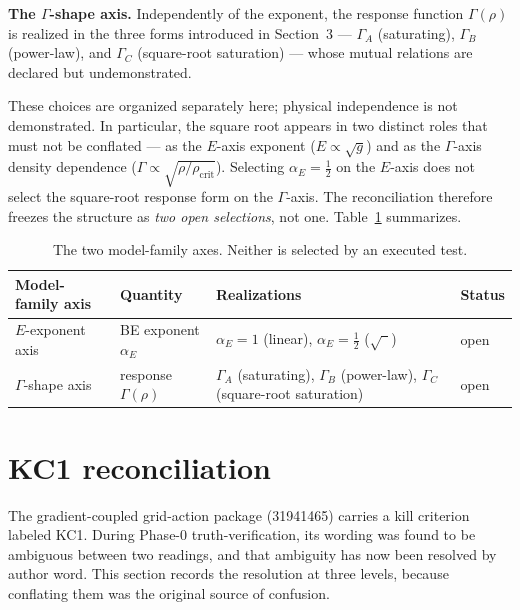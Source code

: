 \documentclass[11pt,a4paper]{article}
\begin{document}
\textbf{The $\Gamma$-shape axis.} Independently of the exponent, the response function $\Gamma(\rho)$ is realized in the three forms introduced in Section~3 --- $\Gamma_{A}$ (saturating), $\Gamma_{B}$ (power-law), and $\Gamma_{C}$ (square-root saturation) --- whose mutual relations are declared but undemonstrated.

These choices are organized separately here; physical independence is not demonstrated. In particular, the square root appears in two distinct roles that must not be conflated --- as the $E$-axis exponent ($E \propto \sqrt{g}$) and as the $\Gamma$-axis density dependence ($\Gamma \propto \sqrt{\rho/\rho_{\mathrm{crit}}}$). Selecting $\alpha_{E} = \tfrac{1}{2}$ on the $E$-axis does not select the square-root response form on the $\Gamma$-axis. The reconciliation therefore freezes the structure as \emph{two open selections}, not one. Table~\ref{tab:axes} summarizes.

\begin{table}[h]
\centering
\small
\begin{tabular}{llll}
\toprule
Model-family axis & Quantity & Realizations & Status \\
\midrule
$E$-exponent axis & BE exponent $\alpha_{E}$ & $\alpha_{E}=1$ (linear), $\alpha_{E}=\tfrac{1}{2}$ ($\sqrt{\phantom{g}}$) & open \\
$\Gamma$-shape axis & response $\Gamma(\rho)$ & $\Gamma_{A}$ (saturating), $\Gamma_{B}$ (power-law), $\Gamma_{C}$ (square-root saturation) & open \\
\bottomrule
\end{tabular}
\caption{The two model-family axes. Neither is selected by an executed test.}
\label{tab:axes}
\end{table}

\section{KC1 reconciliation}
\label{sec:kc1}

The gradient-coupled grid-action package (31941465) carries a kill criterion labeled KC1. During Phase-0 truth-verification, its wording was found to be ambiguous between two readings, and that ambiguity has now been resolved by author word. This section records the resolution at three levels, because conflating them was the original source of confusion.
\end{document}
